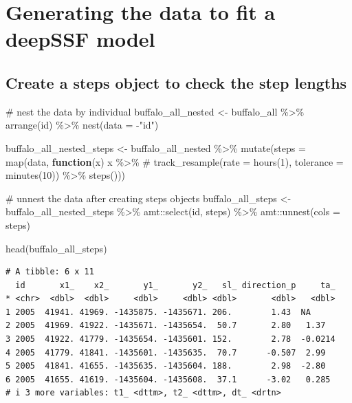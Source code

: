 \documentclass[
  letterpaper,
  DIV=11,
  numbers=noendperiod]{scrartcl}
\newenvironment{Shaded}{\begin{snugshade}}{\end{snugshade}}
\newcommand{\AttributeTok}[1]{\textcolor[rgb]{0.40,0.45,0.13}{#1}}
\newcommand{\CommentTok}[1]{\textcolor[rgb]{0.37,0.37,0.37}{#1}}
\newcommand{\ControlFlowTok}[1]{\textcolor[rgb]{0.00,0.23,0.31}{\textbf{#1}}}
\newcommand{\FunctionTok}[1]{\textcolor[rgb]{0.28,0.35,0.67}{#1}}
\newcommand{\NormalTok}[1]{\textcolor[rgb]{0.00,0.23,0.31}{#1}}
\newcommand{\OtherTok}[1]{\textcolor[rgb]{0.00,0.23,0.31}{#1}}
\newcommand{\SpecialCharTok}[1]{\textcolor[rgb]{0.37,0.37,0.37}{#1}}
\newcommand{\StringTok}[1]{\textcolor[rgb]{0.13,0.47,0.30}{#1}}
\begin{document}
\section{Generating the data to fit a deepSSF
model}\label{generating-the-data-to-fit-a-deepssf-model}

\subsection{Create a steps object to check the step
lengths}\label{create-a-steps-object-to-check-the-step-lengths}

\begin{Shaded}
\begin{Highlighting}[]
\CommentTok{\# nest the data by individual}
\NormalTok{buffalo\_all\_nested }\OtherTok{\textless{}{-}}\NormalTok{ buffalo\_all }\SpecialCharTok{\%\textgreater{}\%} \FunctionTok{arrange}\NormalTok{(id) }\SpecialCharTok{\%\textgreater{}\%} \FunctionTok{nest}\NormalTok{(}\AttributeTok{data =} \SpecialCharTok{{-}}\StringTok{"id"}\NormalTok{)}

\NormalTok{buffalo\_all\_nested\_steps }\OtherTok{\textless{}{-}}\NormalTok{ buffalo\_all\_nested }\SpecialCharTok{\%\textgreater{}\%}
  \FunctionTok{mutate}\NormalTok{(}\AttributeTok{steps =} \FunctionTok{map}\NormalTok{(data, }\ControlFlowTok{function}\NormalTok{(x)}
\NormalTok{    x }\SpecialCharTok{\%\textgreater{}\%} 
      \CommentTok{\# track\_resample(rate = hours(1), tolerance = minutes(10)) \%\textgreater{}\%}
      \FunctionTok{steps}\NormalTok{()))}

\CommentTok{\# unnest the data after creating \textquotesingle{}steps\textquotesingle{} objects}
\NormalTok{buffalo\_all\_steps }\OtherTok{\textless{}{-}}\NormalTok{ buffalo\_all\_nested\_steps }\SpecialCharTok{\%\textgreater{}\%} 
\NormalTok{  amt}\SpecialCharTok{::}\FunctionTok{select}\NormalTok{(id, steps) }\SpecialCharTok{\%\textgreater{}\%} 
\NormalTok{  amt}\SpecialCharTok{::}\FunctionTok{unnest}\NormalTok{(}\AttributeTok{cols =}\NormalTok{ steps)}

\FunctionTok{head}\NormalTok{(buffalo\_all\_steps)}
\end{Highlighting}
\end{Shaded}

\begin{verbatim}
# A tibble: 6 x 11
  id       x1_    x2_       y1_       y2_   sl_ direction_p     ta_
* <chr>  <dbl>  <dbl>     <dbl>     <dbl> <dbl>       <dbl>   <dbl>
1 2005  41941. 41969. -1435875. -1435671. 206.        1.43  NA     
2 2005  41969. 41922. -1435671. -1435654.  50.7       2.80   1.37  
3 2005  41922. 41779. -1435654. -1435601. 152.        2.78  -0.0214
4 2005  41779. 41841. -1435601. -1435635.  70.7      -0.507  2.99  
5 2005  41841. 41655. -1435635. -1435604. 188.        2.98  -2.80  
6 2005  41655. 41619. -1435604. -1435608.  37.1      -3.02   0.285 
# i 3 more variables: t1_ <dttm>, t2_ <dttm>, dt_ <drtn>
\end{verbatim}
\end{document}
